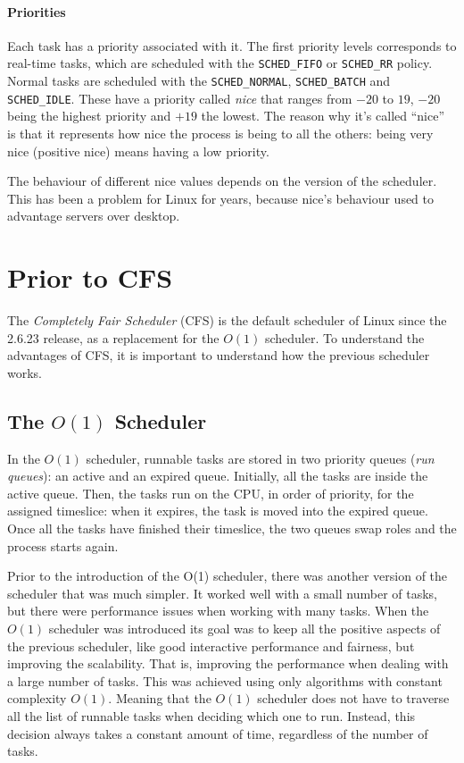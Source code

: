 \paragraph{Priorities} %
Each task has a priority associated with it. The first priority levels
corresponds to real-time tasks, which are scheduled with the
\verb|SCHED_FIFO| or \verb|SCHED_RR| policy. Normal tasks are
scheduled with the \verb|SCHED_NORMAL|, \verb|SCHED_BATCH| and
\verb|SCHED_IDLE|. These have a priority called \textit{nice} that ranges
from $-20$ to $19$, $-20$ being the highest priority and $+19$ the
lowest. The reason why it's called ``nice'' is that it represents how nice the process is being to all the others: being very nice (positive nice) means having a low priority.

The behaviour of different nice values depends on the version
of the scheduler. This has been a problem for Linux for years, because nice's behaviour used to advantage servers over desktop\cite{nice_design}.

\label{sec:cfs}
\section{Prior to CFS}
The \textit{Completely Fair Scheduler} (CFS) is the default scheduler of Linux since the 2.6.23 release, as a replacement for the $O(1)$ scheduler. To understand the advantages of CFS, it is important to understand how the previous scheduler works.

\subsection{The $O(1)$ Scheduler}
In the $O(1)$ scheduler, runnable tasks are stored in two priority queues (\textit{run queues}): an active and an expired queue. Initially, all the tasks are inside the active queue. Then, the tasks run on the CPU, in order of priority, for the assigned timeslice: when it expires, the task is moved into the expired queue. Once all the tasks have finished their timeslice, the two queues swap roles and the process starts again.

Prior to the introduction of the O(1) scheduler, there was another version of the scheduler that was much simpler. It worked well with a small number of tasks, but there were performance issues when working with many tasks. When the $O(1)$ scheduler was introduced its goal was to keep all the positive aspects of the previous scheduler, like good interactive performance and fairness, but improving the scalability. That is, improving the performance when dealing with a large number of tasks.
This was achieved using only algorithms with constant complexity $O(1)$. Meaning that the $O(1)$ scheduler does not have to traverse all the list of runnable tasks when deciding which one to run. Instead, this decision always takes a constant amount of time, regardless of the number of tasks.

